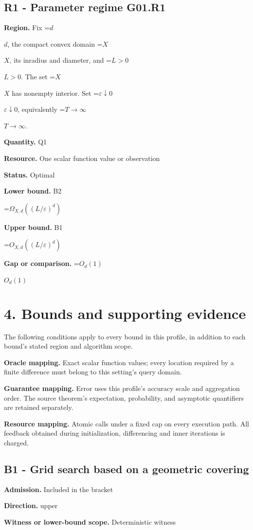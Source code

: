 \documentclass[10pt,a4paper]{article}
\newcommand{\AtlasMath}[1]{\par\begingroup\centering\setbox0=\hbox{$\displaystyle #1$}\ifdim\wd0>1.4\linewidth\typeout{ATLAS WIDE FORMULA: \the\wd0}\fi\ifdim\wd0>\linewidth\resizebox{\linewidth}{!}{\box0}\else\box0\fi\par\endgroup}
\newcommand{\AtlasInlineMath}[1]{\begingroup\setbox0=\hbox{$#1$}\ifdim\wd0>.4\linewidth\endgroup\AtlasMath{#1}\else\endgroup$#1$\fi}
\begin{document}
\subsection{R1 - Parameter regime G01.R1}
\textbf{Region.} Fix \AtlasInlineMath{d}, the compact convex domain \AtlasInlineMath{X}, its inradius and diameter, and \AtlasInlineMath{L>0}. The set \AtlasInlineMath{X} has nonempty interior. Set \AtlasInlineMath{\varepsilon\downarrow0}, equivalently \AtlasInlineMath{T\to\infty}.

\textbf{Quantity.} Q1

\textbf{Resource.} One scalar function value or observation

\textbf{Status.} Optimal

\textbf{Lower bound.} B2

\AtlasMath{\Omega_{X,d}((L/\varepsilon)^d)}
\textbf{Upper bound.} B1

\AtlasMath{O_{X,d}((L/\varepsilon)^d)}
\textbf{Gap or comparison.} \AtlasInlineMath{O_d(1)}

\section{4. Bounds and supporting evidence}
The following conditions apply to every bound in this profile, in addition to each bound's stated region and algorithm scope.

\textbf{Oracle mapping.} Exact scalar function values; every location required by a finite difference must belong to this setting's query domain.

\textbf{Guarantee mapping.} Error uses this profile's accuracy scale and aggregation order. The source theorem's expectation, probability, and asymptotic quantifiers are retained separately.

\textbf{Resource mapping.} Atomic calls under a fixed cap on every execution path. All feedback obtained during initialization, differencing and inner iterations is charged.

\subsection{B1 - Grid search based on a geometric covering}
\textbf{Admission.} Included in the bracket

\textbf{Direction.} upper

\textbf{Witness or lower-bound scope.} Deterministic witness
\end{document}
